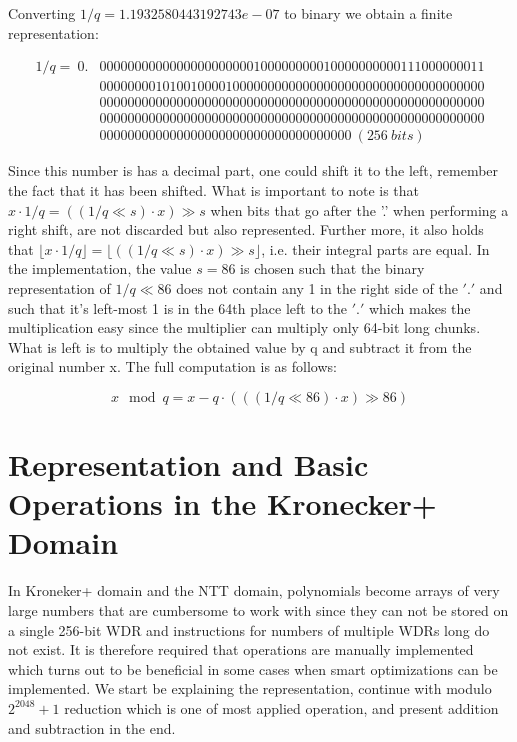 Converting $1/q = 1.1932580443192743e-07$ to binary we obtain a finite representation:

\begin{align*}
  1/q =\ 0.&0000000000000000000000100000000010000000000111000000011\\
        &0000000010100100001000000000000000000000000000000000000\\
        &0000000000000000000000000000000000000000000000000000000\\
        &0000000000000000000000000000000000000000000000000000000\\
        &000000000000000000000000000000000000\ (256\ bits)
\end{align*}

Since this number is has a decimal part, one could shift it to the left, remember the fact that it has been shifted. What is important to note is that $x \cdot 1/q = ((1/q \ll s) \cdot x) \gg s$ when bits that go after the '.' when performing a right shift, are not discarded but also represented. Further more, it also holds that $\lfloor x \cdot 1/q \rfloor = \lfloor ((1/q \ll s) \cdot x) \gg s \rfloor$, i.e. their integral parts are equal. In the implementation, the value $s = 86$ is chosen such that the binary representation of $1/q \ll 86$ does not contain any 1 in the right side of the $'.'$ and such that it's left-most 1 is in the 64th place left to the $'.'$ which makes the multiplication easy since the multiplier can multiply only 64-bit long chunks. What is left is to multiply the obtained value by q and subtract it from the original number x. The full computation is as follows:

\begin{equation*}
  x \mod q = x - q \cdot (((1/q \ll 86) \cdot x) \gg 86)
\end{equation*}

\section{Representation and Basic Operations in the Kronecker+ Domain}

In Kroneker+ domain and the NTT domain, polynomials become arrays of very large numbers that are cumbersome to work with since they can not be stored on a single 256-bit WDR and instructions for numbers of multiple WDRs long do not exist. It is therefore required that operations are manually implemented which turns out to be beneficial in some cases when smart optimizations can be implemented. We start be explaining the representation, continue with modulo $2^{2048} + 1$ reduction which is one of most applied operation, and present addition and subtraction in the end.

